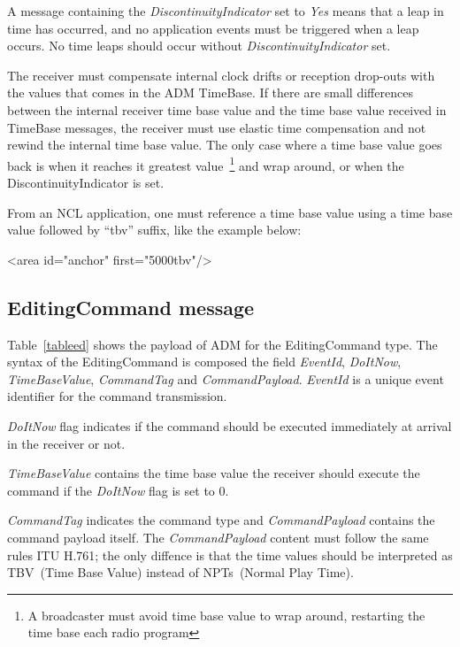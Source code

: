 \documentclass[11pt]{article}
\begin{document}
\begin{appendices}
A message containing the \emph{DiscontinuityIndicator} set to \emph{Yes}
means that a leap in time has occurred, and no application events must be
triggered when a leap occurs. No time leaps should occur without
\emph{DiscontinuityIndicator} set.

The receiver must compensate internal clock drifts or reception drop-outs
with the values that comes in the ADM TimeBase. If there are small
differences between the internal receiver time base value and the time
base value received in TimeBase messages, the receiver must use elastic
time compensation and not rewind the internal time base value. The only
case where a time base value goes back is when it reaches it greatest
value~\footnote{A broadcaster must avoid time base value to wrap around,
restarting the time base each radio program} and wrap around, or when the
DiscontinuityIndicator is set.

From an NCL application, one must reference a time base value using
a time base value followed by ``tbv'' suffix, like the example
below:

\begin{center}
    <area id="anchor" first="5000tbv"/>
\end{center}

\subsection{EditingCommand message}
Table~\ref{tableed} shows the payload of ADM for the EditingCommand
type.
The syntax of the EditingCommand is composed the field
\emph{EventId}, \emph{DoItNow}, \emph{TimeBaseValue},
\emph{CommandTag} and \emph{CommandPayload}.
%
\emph{EventId} is a unique event identifier for the command transmission.

\emph{DoItNow} flag indicates if the command should be executed immediately
at arrival in the receiver or not.

\emph{TimeBaseValue} contains the time base value
the receiver should execute the command if the \emph{DoItNow} flag is set to
0.

\emph{CommandTag} indicates the command type and \emph{CommandPayload}
contains the command payload itself. The \emph{CommandPayload} content must
follow the same rules ITU H.761; the only diffence is that the time values should be
interpreted as TBV~(Time Base Value) instead of NPTs~(Normal Play Time).


\end{appendices}
\end{document}
